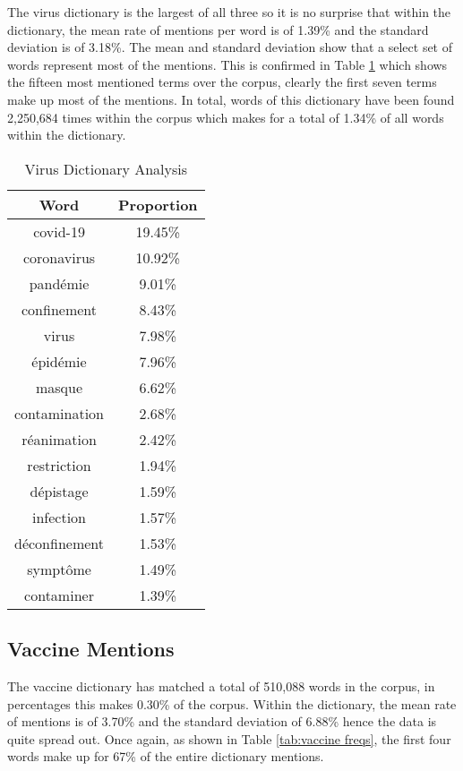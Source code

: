 The virus dictionary is the largest of all three so it is no surprise that within the dictionary, the mean rate of mentions per word is of 1.39\% and the standard deviation is of 3.18\%. The mean and standard deviation show that a select set of words represent most of the mentions. This is confirmed in Table \ref{tab:virus freqs} which shows the fifteen most mentioned terms over the corpus, clearly the first seven terms make up most of the mentions. In total, words of this dictionary have been found 2,250,684 times within the corpus which makes for a total of 1.34\% of all words within the dictionary.

\begin{table}[]
\caption{Virus Dictionary Analysis}
\label{tab:virus freqs}
\centering
\begin{tabular}{@{}cc@{}}
\toprule
Word      & Proportion \\ \midrule
covid-19      & 19.45\% \\
coronavirus   & 10.92\% \\
pandémie      & 9.01\%  \\
confinement   & 8.43\%  \\
virus         & 7.98\%  \\
épidémie      & 7.96\%  \\
masque        & 6.62\%  \\
contamination & 2.68\%  \\
réanimation   & 2.42\%  \\
restriction   & 1.94\%  \\
dépistage     & 1.59\%  \\
infection     & 1.57\%  \\
déconfinement & 1.53\%  \\
symptôme      & 1.49\%  \\
contaminer    & 1.39\%  \\ \bottomrule
\end{tabular}
\end{table}

\subsection{Vaccine Mentions}

The vaccine dictionary has matched a total of 510,088 words in the corpus, in percentages this makes 0.30\% of the corpus. Within the dictionary, the mean rate of mentions is of 3.70\% and the standard deviation of 6.88\% hence the data is quite spread out. Once again, as shown in Table \ref{tab:vaccine freqs}, the first four words make up for 67\% of the entire dictionary mentions.

